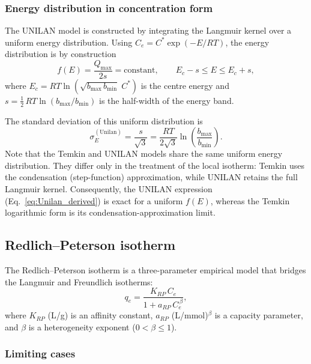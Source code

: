 \documentclass[12pt]{article}
\begin{document}
	\subsubsection{Energy distribution in concentration form}

	The UNILAN model is constructed by integrating the Langmuir kernel
	over a uniform energy distribution. Using
	$C_e = C^{\ast}\exp(-E/RT)$, the energy distribution is by
	construction
	\begin{equation}
		f(E) = \frac{Q_{\max}}{2s} = \mathrm{constant},
		\qquad E_c - s \leq E \leq E_c + s,
		\label{eq:fE_unilan}
	\end{equation}
	where $E_c = RT\ln(\sqrt{b_{\max}\,b_{\min}}\; C^{\ast})$ is the
	centre energy and
	$s = \tfrac{1}{2}\,RT\ln(b_{\max}/b_{\min})$ is the half-width of
	the energy band.

	The standard deviation of this uniform distribution is
	\begin{equation}
		\sigma_E^{\mathrm{(Unilan)}}
		= \frac{s}{\sqrt{3}}
		= \frac{RT}{2\sqrt{3}}
		\ln\!\left(\frac{b_{\max}}{b_{\min}}\right).
		\label{eq:sigmaE_unilan}
	\end{equation}
	Note that the Temkin and UNILAN models share the same uniform energy
	distribution. They differ only in the treatment of the local
	isotherm: Temkin uses the condensation (step-function) approximation,
	while UNILAN retains the full Langmuir kernel. Consequently, the
	UNILAN expression (Eq.~\eqref{eq:Unilan_derived}) is exact for a
	uniform $f(E)$, whereas the Temkin logarithmic form is its
	condensation-approximation limit.

	\subsection{Redlich--Peterson isotherm}

	The Redlich--Peterson isotherm is a three-parameter empirical model
	that bridges the Langmuir and Freundlich isotherms:
	\begin{equation}
		q_e = \frac{K_{RP}\, C_e}{1 + a_{RP}\, C_e^{\,\beta}},
		\label{eq:RedlichPeterson}
	\end{equation}
	where $K_{RP}$ (L/g) is an affinity constant, $a_{RP}$
	(L/mmol)$^{\beta}$ is a capacity parameter, and $\beta$ is a
	heterogeneity exponent ($0 < \beta \leq 1$).

	\subsubsection{Limiting cases}
\end{document}
